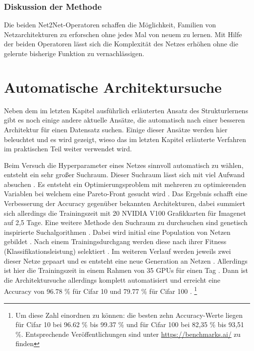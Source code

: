\subsubsection{Diskussion der Methode}

Die beiden Net2Net-Operatoren schaffen die Möglichkeit, Familien von Netzarchitekturen zu erforschen ohne jedes Mal von neuem zu lernen. Mit Hilfe der beiden Operatoren lässt sich die Komplexität des Netzes erhöhen ohne die gelernte bisherige Funktion zu vernachlässigen.




\section{Automatische Architektursuche}\label{sec:auto}
Neben dem im letzten Kapitel ausführlich erläuterten Ansatz des Strukturlernens gibt es noch einige andere aktuelle Ansätze, die automatisch nach einer besseren Architektur für einen Datensatz suchen. Einige dieser Ansätze werden hier beleuchtet und es wird gezeigt, wieso das im letzten Kapitel erläuterte Verfahren im praktischen Teil weiter verwendet wird.

Beim Versuch die Hyperparameter eines Netzes sinnvoll automatisch zu wählen, entsteht ein sehr großer Suchraum. Dieser Suchraum lässt sich mit viel Aufwand absuchen \cite{dvolver}. Es entsteht ein Optimierungsproblem mit mehreren zu optimierenden Variablen bei welchem eine Pareto-Front gesucht wird \cite{dvolver}. Das Ergebnis schafft eine Verbesserung der Accuracy gegenüber bekannten Architekturen, dabei summiert sich allerdings die Trainingszeit mit 20 NVIDIA V100 Grafikkarten für Imagenet auf 2,5 Tage\cite{dvolver}.
Eine weitere Methode den Suchraum zu durchsuchen sind genetisch inspirierte Suchalgorithmen \cite{gen}. Dabei wird initial eine Population von Netzen gebildet \cite{gen}. Nach einem Trainingsdurchgang werden diese nach ihrer Fitness (Klassifikationsleistung) selektiert \cite{gen}. Im weiteren Verlauf werden jeweils zwei dieser Netze gepaart und es entsteht eine neue Generation an Netzen \cite{gen}. Allerdings ist hier die Trainingszeit in einem Rahmen von 35 GPUs für einen Tag \cite{gen}. Dann ist die Architektursuche allerdings komplett automatisiert und erreicht eine Accuracy von 96.78 \% für Cifar 10 und 79.77 \% für Cifar 100 \cite{gen}. \footnote{Um diese Zahl einordnen zu können: die besten zehn Accuracy-Werte liegen für Cifar 10 bei 96.62 \% bis 99.37 \% und für Cifar 100 bei 82,35 \% bis 93,51 \%. Entsprechende Veröffentlichungen sind unter \url{https://benchmarks.ai/} zu finden}  

